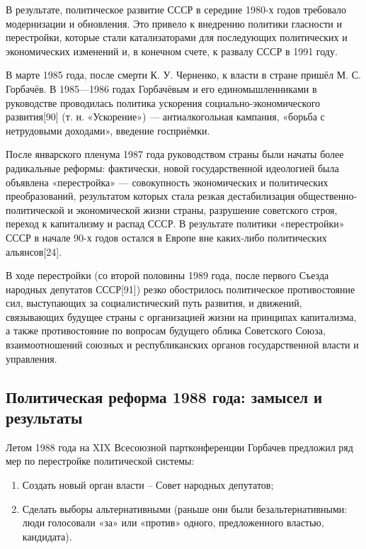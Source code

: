 \documentclass{article}
\begin{document}
В результате, политическое развитие СССР в середине 1980-х годов требовало модернизации и обновления. Это привело к внедрению политики гласности и перестройки, которые стали катализаторами для последующих политических и экономических изменений и, в конечном счете, к развалу СССР в 1991 году.

В марте 1985 года, после смерти К. У. Черненко, к власти в стране пришёл М. С. Горбачёв. В 1985—1986 годах Горбачёвым и его единомышленниками в руководстве проводилась политика ускорения социально-экономического развития[90] (т. н. «Ускорение») — антиалкогольная кампания, «борьба с нетрудовыми доходами», введение госприёмки.

\hfill

После январского пленума 1987 года руководством страны были начаты более радикальные реформы: фактически, новой государственной идеологией была объявлена «перестройка» — совокупность экономических и политических преобразований, результатом которых стала резкая дестабилизация общественно-политической и экономической жизни страны, разрушение советского строя, переход к капитализму и распад СССР. В результате политики «перестройки» СССР в начале 90-х годов остался в Европе вне каких-либо политических альянсов[24].

\hfill

В ходе перестройки (со второй половины 1989 года, после первого Съезда народных депутатов СССР[91]) резко обострилось политическое противостояние сил, выступающих за социалистический путь развития, и движений, связывающих будущее страны с организацией жизни на принципах капитализма, а также противостояние по вопросам будущего облика Советского Союза, взаимоотношений союзных и республиканских органов государственной власти и управления.

\pagebreak
\subsection{Политическая реформа 1988 года: замысел и результаты}

Летом 1988 года на XIX Всесоюзной партконференции Горбачев предложил ряд мер по перестройке политической системы:

\begin{enumerate}
    \item Создать новый орган власти – Совет народных депутатов;
    \item Сделать выборы альтернативными (раньше они были безальтернативными: люди голосовали «за» или «против» одного, предложенного властью, кандидата).
\end{enumerate}
\end{document}

